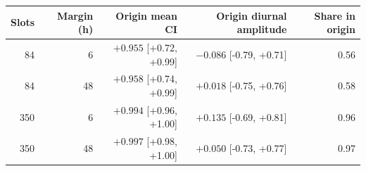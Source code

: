 \begin{tabular}{rrrrr}
\toprule
Slots & Margin (h) & Origin mean CI & Origin diurnal amplitude & Share in origin \\
\midrule
84 & 6 & $+0.955$ [+0.72, +0.99] & $-0.086$ [-0.79, +0.71] & 0.56 \\
84 & 48 & $+0.958$ [+0.74, +0.99] & $+0.018$ [-0.75, +0.76] & 0.58 \\
350 & 6 & $+0.994$ [+0.96, +1.00] & $+0.135$ [-0.69, +0.81] & 0.96 \\
350 & 48 & $+0.997$ [+0.98, +1.00] & $+0.050$ [-0.73, +0.77] & 0.97 \\
\bottomrule
\end{tabular}
